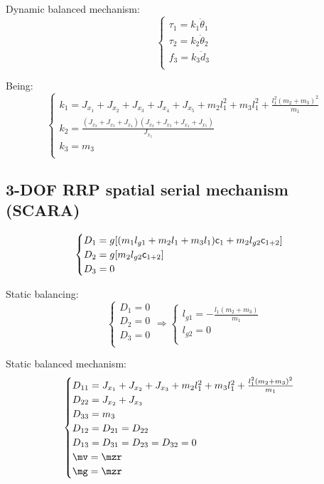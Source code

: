 \documentclass[a4paper,11pt,brazil,fleqn]{article}
\begin{document}
Dynamic balanced mechanism:
\begin{equation}
\begin{cases}
\tau_1 = k_1 \ddot{\theta}_1 \\
\tau_2 = k_2 \ddot{\theta}_2 \\
f_3 = k_3 \ddot{d}_3 \\
\end{cases}
\end{equation}

Being:
\begin{equation}
\begin{cases}
k_1 = J_{x_1} + J_{x_2} + J_{x_3} + J_{x_4} + J_{x_5} + m_2 l_1^2 + m_3 l_1^2 + \frac{l_1^2 (m_2 + m_3)^2}{m_1} \\
k_2 = \frac{(J_{x_2}+J_{x_3}+J_{x_4})(J_{x_2}+J_{x_3}+J_{x_4}+J_{x_5})}{J_{x_5}} \\
k_3 = m_3 \\
\end{cases}
\end{equation}

\subsection{3-DOF RRP spatial serial mechanism (SCARA)} \label{S03-2}

\begin{equation}
\begin{cases}
D_1 = g[ (m_1 l_{g1} + m_2 l_1 + m_3 l_1 ) \mathsf{c}_1 + m_2 l_{g2} \mathsf{c}_{1+2} ] \\
D_2 = g[ m_2 l_{g2} \mathsf{c}_{1+2}  ] \\
D_3 = 0 \\
\end{cases}
\end{equation} 

Static balancing:
\begin{equation}
\begin{cases}
D_1 = 0 \\
D_2 = 0 \\
D_3 = 0 \\
\end{cases}
\Rightarrow
\begin{cases}
l_{g1} = -\frac{l_1 (m_2+m_3)}{m_1} \\
l_{g2} = 0 \\
\end{cases}
\end{equation}

Static balanced mechanism:
\begin{equation}
\begin{cases}
D_{11} = J_{x_1} + J_{x_2} + J_{x_3} + m_2 l_1^2 + m_3 l_1^2 + \frac{l_1^2 (m_2 + m_3)^2}{m_1} \\
D_{22} = J_{x_2} + J_{x_3} \\
D_{33} = m_3 \\
D_{12} =  D_{21} = D_{22} \\
D_{13} = D_{31} = D_{23} = D_{32} = 0 \\
\mv = \mzr \\
\mg = \mzr
\end{cases}
\end{equation}
\end{document}
